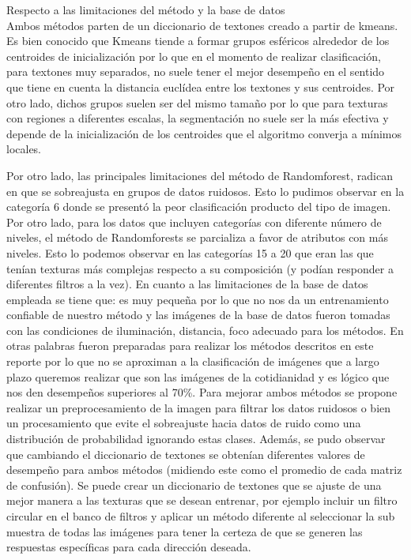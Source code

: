 \documentclass[10pt,twocolumn,letterpaper]{article}
\begin{document}
Respecto a las limitaciones del método y la base de datos\\

Ambos métodos parten de un diccionario de textones creado a partir de kmeans. Es bien conocido que Kmeans tiende a formar grupos esféricos alrededor de los centroides de inicialización por lo que en el momento de realizar clasificación, para textones muy separados, no suele tener el mejor desempeño en el sentido que tiene en cuenta la distancia euclídea entre los textones y
sus centroides.
Por otro lado, dichos grupos suelen ser del mismo tamaño por lo que para texturas con regiones a diferentes escalas, la segmentación no suele ser la más efectiva y depende de la inicialización de los centroides que el algoritmo converja a mínimos locales.

Por otro lado, las principales limitaciones del método de Randomforest, radican en que se sobreajusta en grupos de datos ruidosos. Esto lo pudimos observar en la categoría 6 donde se presentó la peor clasificación producto del tipo de imagen. Por otro lado, para los datos que incluyen categorías con diferente número de niveles, el método de Randomforests se parcializa a favor de atributos con más niveles. Esto lo podemos observar en las categorías 15 a 20 que eran las que tenían texturas más complejas respecto a su composición (y podían responder a diferentes filtros a la vez). 
En cuanto a las limitaciones de la base de datos empleada se tiene que: es muy pequeña por lo que no nos da un entrenamiento confiable de nuestro método y las imágenes de la base de datos fueron tomadas con las condiciones de iluminación, distancia, foco adecuado para los métodos. En otras palabras fueron preparadas para realizar los métodos descritos en este reporte por lo que no se aproximan a la clasificación de imágenes que a largo plazo queremos realizar que son las imágenes de la cotidianidad y es lógico que nos den desempeños superiores al 70\%.
Para mejorar ambos métodos se propone realizar un preprocesamiento de la imagen para filtrar los datos ruidosos o bien un procesamiento que evite el sobreajuste hacia datos de ruido como una distribución de probabilidad ignorando estas clases. Además, se pudo observar que cambiando el diccionario de textones se obtenían diferentes valores de desempeño para ambos métodos (midiendo este como el promedio de cada matriz de confusión). Se puede crear un diccionario de textones que se ajuste de una mejor manera a las texturas que se desean entrenar, por ejemplo incluir un filtro circular en el banco de filtros y aplicar un método diferente al seleccionar la sub muestra de todas las imágenes para tener la certeza de que se generen las respuestas específicas para cada dirección deseada.
\end{document}
